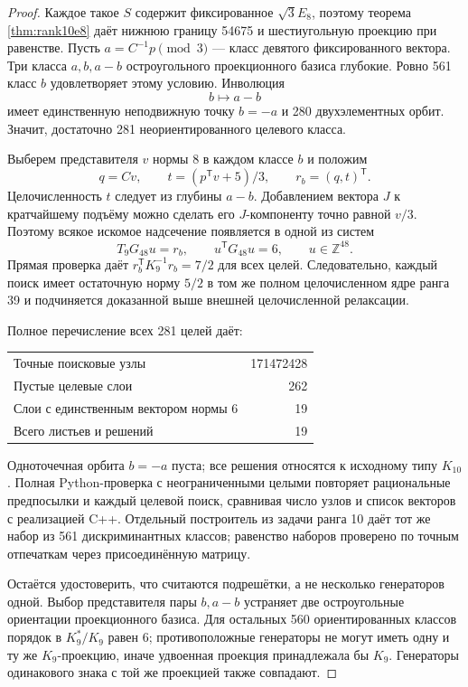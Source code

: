 \documentclass[11pt,a4paper]{article}
\theoremstyle{remark}\newtheorem{remark}[theorem]{Замечание}
\newcommand{\Z}{\mathbb Z}\newcommand{\R}{\mathbb R}\newcommand{\F}{\mathbb F}
\begin{document}
\begin{proof}
Каждое такое $S$ содержит фиксированное $\sqrt3E_8$, поэтому теорема \ref{thm:rank10e8} даёт нижнюю границу 54675 и шестиугольную проекцию при равенстве. Пусть $a=C^{-1}p\pmod3$ --- класс девятого фиксированного вектора. Три класса $a,b,a-b$ остроугольного проекционного базиса глубокие. Ровно 561 класс $b$ удовлетворяет этому условию. Инволюция
\[
b\longmapsto a-b
\]
имеет единственную неподвижную точку $b=-a$ и 280 двухэлементных орбит. Значит, достаточно 281 неориентированного целевого класса.

Выберем представителя $v$ нормы 8 в каждом классе $b$ и положим
\[
q=Cv,\qquad t=(p^{\mathsf T}v+5)/3,\qquad r_b=(q,t)^{\mathsf T}.
\]
Целочисленность $t$ следует из глубины $a-b$. Добавлением вектора $J$ к кратчайшему подъёму можно сделать его $J$-компоненту точно равной $v/3$. Поэтому всякое искомое надсечение появляется в одной из систем
\[
T_9G_{48}u=r_b,\qquad u^{\mathsf T}G_{48}u=6,\qquad u\in\Z^{48}.
\]
Прямая проверка даёт $r_b^{\mathsf T}K_9^{-1}r_b=7/2$ для всех целей. Следовательно, каждый поиск имеет остаточную норму $5/2$ в том же полном целочисленном ядре ранга 39 и подчиняется доказанной выше внешней целочисленной релаксации.

Полное перечисление всех 281 целей даёт:
\begin{center}
\begin{tabular}{lr}
\toprule
Точные поисковые узлы &171472428\\
Пустые целевые слои &262\\
Слои с единственным вектором нормы 6 &19\\
Всего листьев и решений &19\\
\bottomrule
\end{tabular}
\end{center}
Одноточечная орбита $b=-a$ пуста; все решения относятся к исходному типу $K_{10}$. Полная Python-проверка с неограниченными целыми повторяет рациональные предпосылки и каждый целевой поиск, сравнивая число узлов и список векторов с реализацией C++. Отдельный построитель из задачи ранга 10 даёт тот же набор из 561 дискриминантных классов; равенство наборов проверено по точным отпечаткам через присоединённую матрицу.

Остаётся удостоверить, что считаются подрешётки, а не несколько генераторов одной. Выбор представителя пары $b,a-b$ устраняет две остроугольные ориентации проекционного базиса. Для остальных 560 ориентированных классов порядок в $K_9^*/K_9$ равен 6; противоположные генераторы не могут иметь одну и ту же $K_9$-проекцию, иначе удвоенная проекция принадлежала бы $K_9$. Генераторы одинакового знака с той же проекцией также совпадают.


\end{proof}
\end{document}
